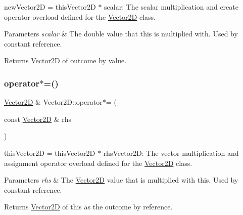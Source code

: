 new\+Vector2D = this\+Vector2D $\ast$ scalar\+: The scalar multiplication and create operator overload defined for the \hyperlink{class_vector2_d}{Vector2D} class. 


\begin{DoxyParams}{Parameters}
{\em scalar} & The double value that this is multiplied with. Used by constant reference. \\
\hline
\end{DoxyParams}
\begin{DoxyReturn}{Returns}
\hyperlink{class_vector2_d}{Vector2D} of outcome by value. 
\end{DoxyReturn}
\mbox{\label{class_vector2_d_a7fe58ba3258641c02c7ea4499d42a089}} 
\subsubsection{\texorpdfstring{operator$\ast$=()}{operator*=()}\hspace{0.1cm}{\footnotesize\ttfamily [1/2]}}
{\footnotesize\ttfamily \hyperlink{class_vector2_d}{Vector2D} \& Vector2\+D\+::operator$\ast$= (\begin{DoxyParamCaption}\item[{const \hyperlink{class_vector2_d}{Vector2D} \&}]{rhs }\end{DoxyParamCaption})}



this\+Vector2D = this\+Vector2D $\ast$ rhs\+Vector2D\+: The vector multiplication and assignment operator overload defined for the \hyperlink{class_vector2_d}{Vector2D} class. 


\begin{DoxyParams}{Parameters}
{\em rhs} & The \hyperlink{class_vector2_d}{Vector2D} value that is multiplied with this. Used by constant reference. \\
\hline
\end{DoxyParams}
\begin{DoxyReturn}{Returns}
\hyperlink{class_vector2_d}{Vector2D} of this as the outcome by reference. 
\end{DoxyReturn}
\mbox{\label{class_vector2_d_abd5d60f6e25137acab01b1d82da6819a}} 
